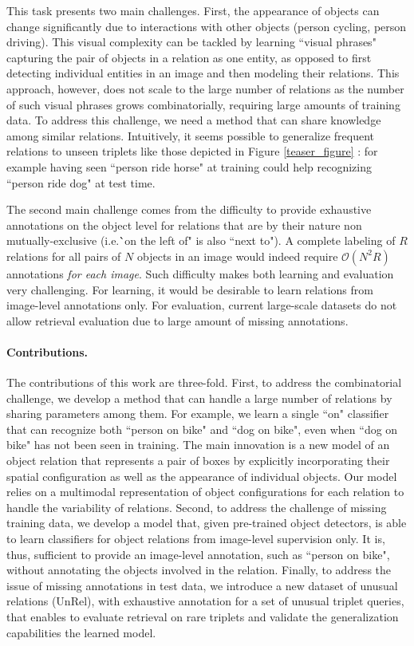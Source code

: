 \documentclass[10pt,twocolumn,letterpaper]{article}
\newcommand{\spaceparagraph}{\vspace{-.35cm}}
\newcommand{\gotoline}{\vspace{.05cm}}
\begin{document}
\gotoline
\vspace{4pt}
This task presents two main challenges. 
First, the appearance of objects can change significantly due to interactions with other objects (person cycling, person driving).
This visual complexity can be tackled by learning ``visual phrases"~\cite{Sadeghi2011} capturing the pair
of objects in a relation as one entity, as opposed to first detecting individual entities in an image and then modeling their relations. 
This approach, however, does not scale to the large number of relations as the number of such visual phrases grows combinatorially, requiring large amounts of training data.
To address this challenge, we need a method that can share knowledge among similar relations.
Intuitively, it seems possible to generalize frequent relations to unseen triplets like those depicted in Figure \ref{teaser_figure} : for example having seen ``person ride horse" at training could help recognizing ``person ride dog" at test time.


\gotoline
The second main challenge comes from the difficulty to provide exhaustive annotations on the object level for relations that are by their nature non mutually-exclusive (i.e.\``on the left of" is also ``next to"). A complete labeling of $R$ relations for all pairs of $N$ objects in an image would indeed require $\mathcal{O}(N^{2}R)$ annotations {\em for each image}. Such difficulty makes both learning and evaluation very challenging. For learning, it would be desirable to learn relations from image-level annotations only. For evaluation, current large-scale datasets \cite{Krishna2016,Lu16} do not allow retrieval evaluation due to large amount of missing annotations. 


\spaceparagraph
\paragraph{Contributions.}
The contributions of this work are three-fold. First, to address the combinatorial challenge, we develop a method that can handle a large number of relations by sharing parameters among them. 
For example, we learn  a single ``on" classifier that can recognize
both ``person on bike" and ``dog on bike", even when ``dog on bike" has not been seen in training.  The main innovation is a
new model of an object relation that represents a pair of boxes by
explicitly incorporating their spatial configuration as well as the
appearance of individual objects. 
Our model relies on a multimodal representation of object configurations for each relation to handle the variability of relations. Second, to
address the challenge of missing training data, we develop a model that, given
pre-trained object detectors, is able to learn classifiers for object
relations from image-level supervision only. It is, thus, sufficient 
to provide an image-level annotation, such as  ``person on bike", without
annotating the objects involved in the relation. 
Finally, to address the issue of missing annotations in test data, we introduce a new
dataset of unusual relations (UnRel), with exhaustive annotation for a
set of unusual triplet queries, that enables to evaluate retrieval on
rare triplets and validate the generalization capabilities the learned
model.  
\end{document}
